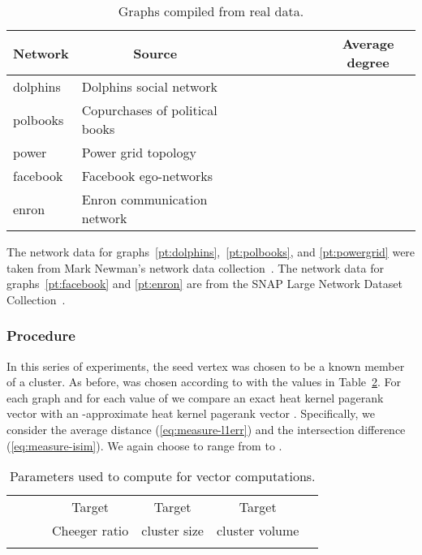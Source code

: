 \documentclass[runningheads,a4paper]{llncs}
\begin{document}
\begin{table}
\centering
\begin{tabular}{|p{2cm}|l|c|c|c|}
\hline
\multicolumn{1}{|c|}{Network} & \multicolumn{1}{|c|}{Source} & ~~~~ & ~~~~ & Average degree\\
\hline\hline
dolphins & Dolphins social network~\cite{dolphins} &  &  & \\\hline
polbooks & Copurchases of political books~\cite{polbooks} &  &  &
\\\hline
power & Power grid topology~\cite{powergrid} &  &  & \\\hline
facebook & Facebook ego-networks~\cite{facebook} &  &  &
\\\hline
enron & Enron communication network~\cite{enron} &  &  &
\\
\hline
\end{tabular}
\caption{Graphs compiled from real data.}
\label{table:realgraphs}
\end{table}

The network data for graphs~\ref{pt:dolphins},~\ref{pt:polbooks}, and
\ref{pt:powergrid} were taken from Mark Newman's network data
collection~\cite{newmandata}.  The network data for graphs~\ref{pt:facebook} and
\ref{pt:enron} are from the SNAP Large Network Dataset
Collection~\cite{snapdata}.

\subsubsection{Procedure} In this series of experiments, the seed vertex  was
chosen to be a known member of a cluster.  As before,  was chosen according
to  with the values in Table~\ref{table:realrankingparams}.
For each graph and for each value of  we compare an exact heat kernel
pagerank vector  with an -approximate heat kernel pagerank
vector .  Specifically, we consider the average  distance
(\ref{eq:measure-l1err}) and the intersection difference
(\ref{eq:measure-isim}).  We again choose  to range from  to .

\begin{table}
\centering
\begin{tabular}{|c|c|c|c|c|}
\hline
~~~~ & Target        & Target       & Target         & \\
               & Cheeger ratio & cluster size & cluster volume &\\
\hline
 &  &  &  & \\
\hline
\end{tabular}
\caption{Parameters used to compute  for vector computations.}
\label{table:realrankingparams} 
\end{table}
\end{document}
